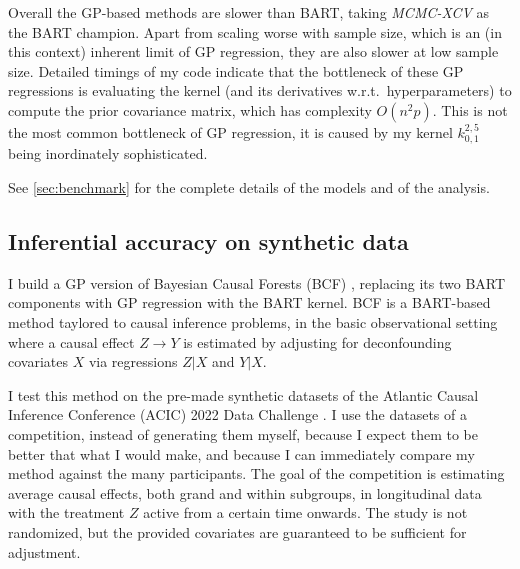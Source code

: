 \documentclass[a4paper]{article}
\theoremstyle{definition}
\begin{document}
    Overall the GP-based methods are slower than BART, taking \emph{MCMC-XCV} as the BART champion. Apart from scaling worse with sample size, which is an (in this context) inherent limit of GP regression, they are also slower at low sample size. Detailed timings of my code indicate that the bottleneck of these GP regressions is evaluating the kernel (and its derivatives w.r.t.\ hyperparameters) to compute the prior covariance matrix, which has complexity $O(n^2p)$. This is not the most common bottleneck of GP regression, it is caused by my kernel $k^{2,5}_{0,1}$ being inordinately sophisticated.
    
    See \autoref{sec:benchmark} for the complete details of the models and of the analysis.

    \subsection{Inferential accuracy on synthetic data}
    \label{sec:acic}

    I build a GP version of Bayesian Causal Forests (BCF) \autocite{hahn2020}, replacing its two BART components with GP regression with the BART kernel. BCF is a BART-based method taylored to causal inference problems, in the basic observational setting where a causal effect $Z\rightarrow Y$ is estimated by adjusting for deconfounding covariates $X$ via regressions $Z|X$ and $Y|X$.

    I test this method on the pre-made synthetic datasets of the Atlantic Causal Inference Conference (ACIC) 2022 Data Challenge \autocite{thal2023}. I use the datasets of a competition, instead of generating them myself, because I expect them to be better that what I would make, and because I can immediately compare my method against the many participants. The goal of the competition is estimating average causal effects, both grand and within subgroups, in longitudinal data with the treatment $Z$ active from a certain time onwards. The study is not randomized, but the provided covariates are guaranteed to be sufficient for adjustment.
\end{document}
